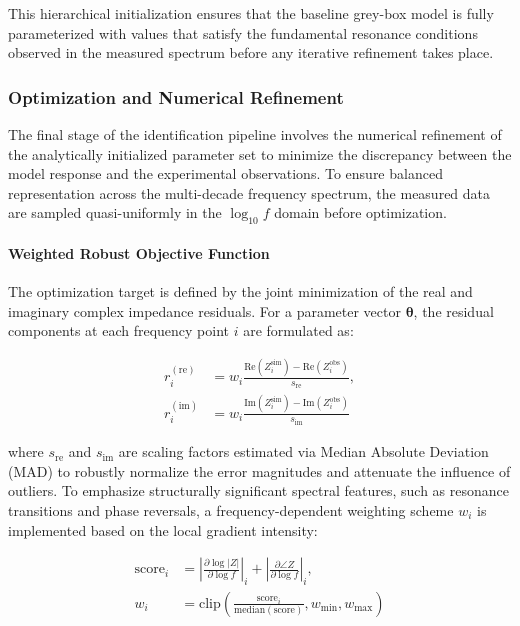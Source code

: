 \documentclass[12pt,a4paper]{article}
\begin{document}
This hierarchical initialization ensures that the baseline grey-box model is fully parameterized with values that satisfy the fundamental resonance conditions observed in the measured spectrum before any iterative refinement takes place.

\subsubsection{Optimization and Numerical Refinement}

The final stage of the identification pipeline involves the numerical refinement of the analytically initialized parameter set to minimize the discrepancy between the model response and the experimental observations. To ensure balanced representation across the multi-decade frequency spectrum, the measured data are sampled quasi-uniformly in the $\log_{10} f$ domain before optimization\cite{ref12,ref13,ref38,ref40,ref52}.

\paragraph{Weighted Robust Objective Function}
The optimization target is defined by the joint minimization of the real and imaginary complex impedance residuals. For a parameter vector $\boldsymbol\theta$, the residual components at each frequency point $i$ are formulated as:

\begin{equation}
\begin{aligned}
r_i^{(\text{re})} &= w_i \frac{\text{Re}(Z_i^{\text{sim}}) - \text{Re}(Z_i^{\text{obs}})}{s_{\text{re}}}, \\
r_i^{(\text{im})} &= w_i \frac{\text{Im}(Z_i^{\text{sim}}) - \text{Im}(Z_i^{\text{obs}})}{s_{\text{im}}}
\end{aligned}
\end{equation}

where $s_{\text{re}}$ and $s_{\text{im}}$ are scaling factors estimated via Median Absolute Deviation (MAD) to robustly normalize the error magnitudes and attenuate the influence of outliers. To emphasize structurally significant spectral features, such as resonance transitions and phase reversals, a frequency-dependent weighting scheme $w_i$ is implemented based on the local gradient intensity:

\begin{equation}
\begin{aligned}
\text{score}_i &= \left| \frac{\partial \log |Z|}{\partial \log f} \right|_i + \left| \frac{\partial \angle Z}{\partial \log f} \right|_i, \\
w_i &= \text{clip} \left( \frac{\text{score}_i}{\text{median}(\text{score})}, w_{\min}, w_{\max} \right)
\end{aligned}
\end{equation}
\end{document}
